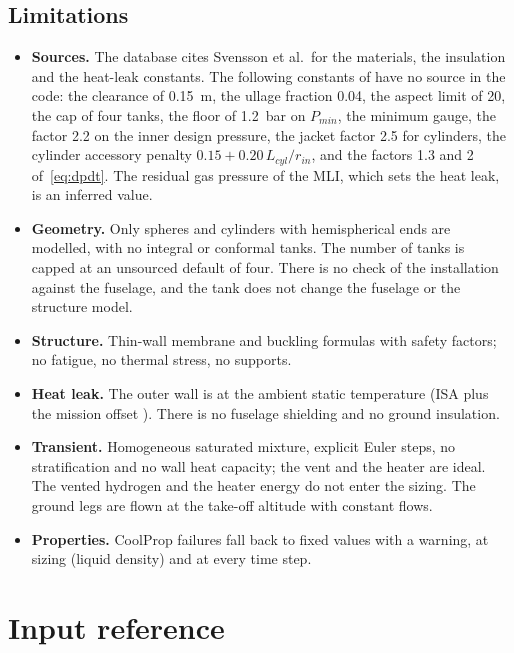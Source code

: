 \documentclass[a4paper,11pt]{article}
\begin{document}
\subsection{Limitations}
\begin{itemize}
\item \textbf{Sources.} The database cites Svensson et al.\ for the materials, the insulation and
  the heat-leak constants. The following constants of  have no source in the code:
  the clearance of \SI{0.15}{m}, the ullage fraction 0.04, the aspect limit of 20, the cap of
  four tanks, the floor of \SI{1.2}{bar} on $P_{min}$, the minimum gauge, the factor 2.2 on the
  inner design pressure, the jacket factor 2.5 for cylinders, the cylinder accessory penalty
  $0.15 + 0.20\,L_{cyl}/r_{in}$, and the factors 1.3 and 2 of~\eqref{eq:dpdt}. The residual gas
  pressure of the MLI, which sets the heat leak, is an inferred value.
\item \textbf{Geometry.} Only spheres and cylinders with hemispherical ends are modelled, with
  no integral or conformal tanks. The number of tanks is capped at an unsourced default of four.
  There is no check of the installation against the fuselage, and the tank does not change the
  fuselage or the structure model.
\item \textbf{Structure.} Thin-wall membrane and buckling formulas with safety factors; no
  fatigue, no thermal stress, no supports.
\item \textbf{Heat leak.} The outer wall is at the ambient static temperature (ISA plus the
  mission offset ). There is no fuselage shielding and no ground insulation.
\item \textbf{Transient.} Homogeneous saturated mixture, explicit Euler steps, no
  stratification and no wall heat capacity; the vent and the heater are ideal. The vented
  hydrogen and the heater energy do not enter the sizing. The ground legs are flown at the
  take-off altitude with constant flows.
\item \textbf{Properties.} CoolProp failures fall back to fixed values with a warning, at
  sizing (liquid density) and at every time step.
\end{itemize}

\appendix
\section{Input reference}\label{app:inputs}
\end{document}
